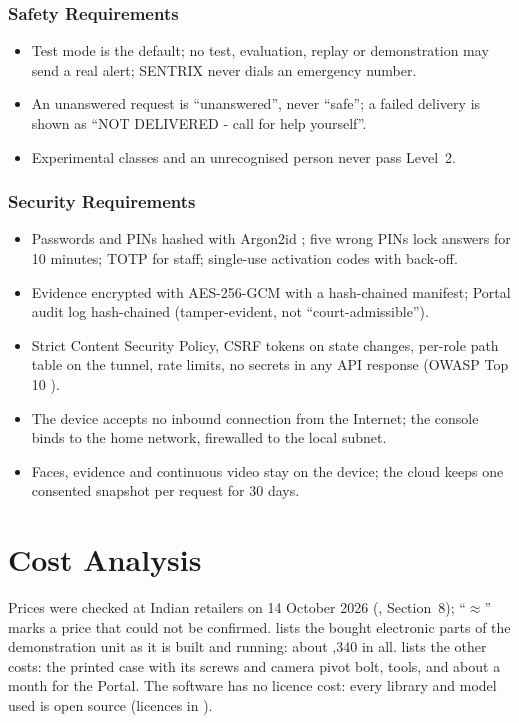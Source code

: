 \subsubsection{Safety Requirements}
\begin{itemize}
\item Test mode is the default; no test, evaluation, replay or demonstration may send a real alert; SENTRIX never dials an emergency number.
\item An unanswered request is ``unanswered'', never ``safe''; a failed delivery is shown as ``NOT DELIVERED - call for help yourself''.
\item Experimental classes and an unrecognised person never pass Level~2.
\end{itemize}

\subsubsection{Security Requirements}
\begin{itemize}
\item Passwords and PINs hashed with Argon2id \cite{rfc9106}; five wrong PINs lock answers for 10 minutes; TOTP \cite{rfc6238} for staff; single-use activation codes with back-off.
\item Evidence encrypted with AES-256-GCM \cite{nist80038d} with a hash-chained manifest; Portal audit log hash-chained (tamper-evident, not ``court-admissible'').
\item Strict Content Security Policy, CSRF tokens on state changes, per-role path table on the tunnel, rate limits, no secrets in any API response (OWASP Top 10 \cite{owasp2021}).
\item The device accepts no inbound connection from the Internet; the console binds to the home network, firewalled to the local subnet.
\item Faces, evidence and continuous video stay on the device; the cloud keeps one consented snapshot per request for 30 days.
\end{itemize}

\section{Cost Analysis}
\label{sec:cost}
Prices were checked at Indian retailers on 14 October 2026 (, Section~8); ``$\approx$'' marks a price that could not be confirmed.  lists the bought electronic parts of the demonstration unit as it is built and running: about ,340 in all.  lists the other costs: the printed case with its screws and camera pivot bolt, tools, and about  a month for the Portal. The software has no licence cost: every library and model used is open source (licences in ).

